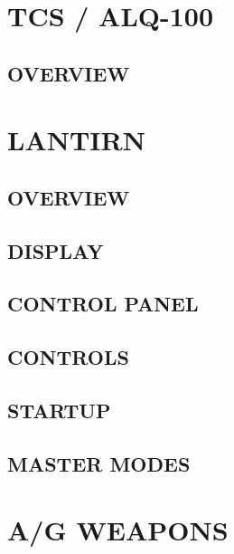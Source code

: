 \documentclass[8pt,usenames,dvipsnames,twoside]{article}
\begin{document}
		\cleardoublepage
		
		\section{TCS / ALQ-100}
		
		\subsection{OVERVIEW}
		
		\cleardoublepage
		
		\section{LANTIRN}
		
		\subsection{OVERVIEW}
		\subsection{DISPLAY}
		\subsection{CONTROL PANEL}
		\subsection{CONTROLS}
		\subsection{STARTUP}
		\subsection{MASTER MODES}
		
		\cleardoublepage
		
		\section{A/G WEAPONS}
		
\end{document}
